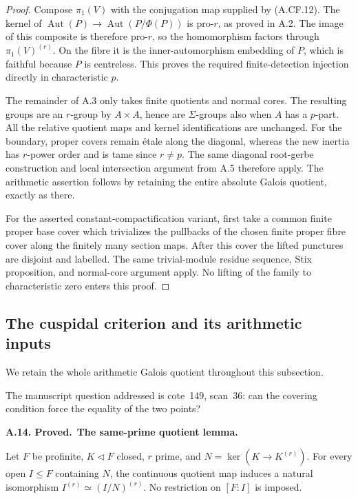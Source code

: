\documentclass[11pt,a4paper]{article}
\newenvironment{claim}[3]{\par\medskip\noindent\hypertarget{#1}{\textbf{#1. #2.}}\ \textbf{#3.}\par\nopagebreak\smallskip\begingroup\itshape}{\endgroup\par\smallskip}
\begin{document}
\begin{proof}
Compose \(\pi_1(V)\) with the conjugation map supplied by (A.CF.12).
The kernel of
\(\operatorname{Aut}(P)\to\operatorname{Aut}(P/\Phi(P))\)
is pro-\(r\), as proved in A.2. The image of this composite is
therefore pro-\(r\), so the homomorphism factors through
\(\pi_1(V)^{(r)}\). On the fibre it is the inner-automorphism
embedding of \(P\), which is faithful because \(P\) is centreless.
This proves the required finite-detection injection directly in
characteristic \(p\).

The remainder of A.3 only takes finite quotients and normal cores.
The resulting groups are an \(r\)-group by \(A\times A\), hence
are \(\Sigma\)-groups also when \(A\) has a \(p\)-part. All the
relative quotient maps and kernel identifications are unchanged.
For the boundary, proper covers remain étale along the diagonal,
whereas the new inertia has \(r\)-power order and is tame since
\(r\ne p\). The same diagonal root-gerbe construction and local
intersection argument from A.5 therefore apply. The arithmetic
assertion follows by retaining the entire absolute Galois quotient,
exactly as there.

For the asserted constant-compactification variant, first take a
common finite proper base cover which trivializes the pullbacks of
the chosen finite proper fibre cover along the finitely many section
maps. After this cover the lifted punctures are disjoint and labelled.
The same trivial-module residue sequence, Stix proposition, and
normal-core argument apply. No lifting of the family to characteristic
zero enters this proof.
\end{proof}


\subsection{The cuspidal criterion and its arithmetic inputs}

We retain the whole arithmetic Galois quotient throughout this subsection.

The manuscript question addressed is cote~149, scan~36: can the covering condition force the equality of the two points?

\begin{claim}{A.14}{Proved}{The same-prime quotient lemma}

Let $F$ be profinite, $K\triangleleft F$ closed, $r$ prime, and
$N=\ker(K\to K^{(r)})$. For every open $I\le F$ containing $N$, the
continuous quotient map induces a natural isomorphism
$I^{(r)}\simeq(I/N)^{(r)}$. No restriction on $[F:I]$ is imposed.

\end{claim}
\end{document}
